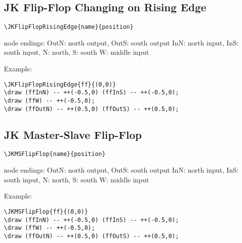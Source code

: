 \documentclass[parskip=full]{scrartcl}
\begin{document}
\subsection{JK Flip-Flop Changing on Rising Edge}

\begin{verbatim}
\JKFlipFlopRisingEdge{name}{position}
\end{verbatim}
node endings: OutN: north output, OutS: south output
              InN: north input, InS: south input,
              N: north, S: south
              W: middle input

Example:\\
\begin{minipage}{0.8\textwidth}
\begin{verbatim}
\JKFlipFlopRisingEdge{ff}{(0,0)}
\draw (ffInN) -- ++(-0.5,0) (ffInS) -- ++(-0.5,0);
\draw (ffW) -- ++(-0.5,0);
\draw (ffOutN) -- ++(0.5,0) (ffOutS) -- ++(0.5,0);
\end{verbatim}
\end{minipage}
\begin{minipage}{0.19\textwidth}
\end{minipage}

\subsection{JK Master-Slave Flip-Flop}

\begin{verbatim}
\JKMSFlipFlop{name}{position}
\end{verbatim}
node endings: OutN: north output, OutS: south output
              InN: north input, InS: south input,
              N: north, S: south
              W: middle input

Example:\\
\begin{minipage}{0.8\textwidth}
\begin{verbatim}
\JKMSFlipFlop{ff}{(0,0)}
\draw (ffInN) -- ++(-0.5,0) (ffInS) -- ++(-0.5,0);
\draw (ffW) -- ++(-0.5,0);
\draw (ffOutN) -- ++(0.5,0) (ffOutS) -- ++(0.5,0);
\end{verbatim}
\end{minipage}
\begin{minipage}{0.19\textwidth}
\end{minipage}
\end{document}
